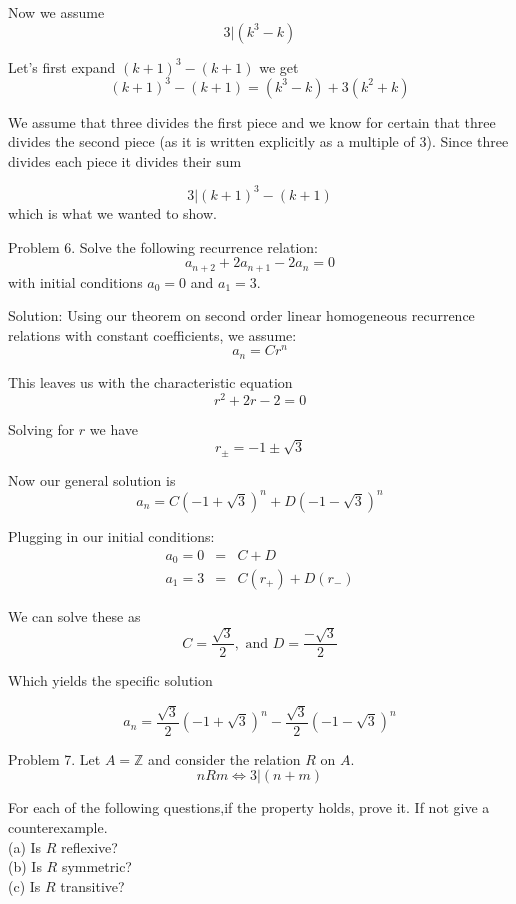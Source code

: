 \documentclass[16 pt]{amsart}
\theoremstyle{definition}
\theoremstyle{remark}
\numberwithin{equation}{subsection}
\newcommand{\Z}{\mathbb{Z}}
\begin{document}
Now we assume 
\[
3|(k^3-k)
\]

Let's first expand $(k+1)^3-(k+1)$ we get
\[
(k+1)^3-(k+1) = (k^3-k) + 3(k^2+k)
\]

We assume that three divides the first piece and we know for certain that three divides the second piece (as it is written explicitly as a multiple of 3).  Since three divides each piece it divides their sum

\[
3| (k+1)^3-(k+1)
\]
which is what we wanted to show.

\newpage

Problem 6.
Solve the following recurrence relation:
\[
a_{n+2}+2a_{n+1}-2a_n = 0
\]
with initial conditions $a_0=0$ and $a_1=3$.


\vspace{1in}


Solution:
Using our theorem on second order linear homogeneous recurrence relations with constant coefficients, we assume:
\[
a_n = Cr^n
\]

This leaves us with the characteristic equation
\[
r^2 + 2r - 2 =0
\]

Solving for $r$ we have
\[
r_{\pm} = -1 \pm \sqrt{3}
\]

Now our general solution is
\[
a_n = C(-1+\sqrt{3})^n + D(-1-\sqrt{3})^n
\]

Plugging in our initial conditions:
\begin{eqnarray}
a_0 = 0 & = & C + D \nonumber \\
a_1 = 3 & = & C(r_+)+D(r_-) \nonumber
\end{eqnarray}

We can solve these as
\[
C = \frac{\sqrt{3}}{2}, \text{ and } D = \frac{-\sqrt{3}}{2}
\]

Which yields the specific solution

\[
a_n = \frac{\sqrt{3}}{2}(-1+\sqrt{3})^n - \frac{\sqrt{3}}{2}(-1-\sqrt{3})^n
\]

\newpage

Problem 7. Let $A=\Z$ and consider the relation $R$ on $A$.
\[
nRm \iff 3|(n+m)
\]


For each of the following questions,if the property holds, prove it. If not give a counterexample.\\

(a) Is $R$ reflexive?\\

(b) Is $R$ symmetric?\\

(c) Is $R$ transitive?
\end{document}
